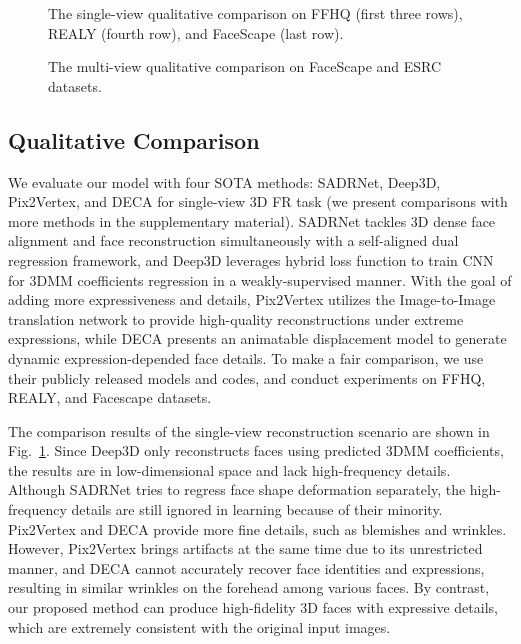 \documentclass[10pt,twocolumn,letterpaper]{article}
\begin{document}
\begin{figure}[t]
  \centering
     \vspace{-10pt}
  \caption{The single-view qualitative comparison on FFHQ (first three rows), REALY (fourth row), and FaceScape (last row).}
  \label{fig: cmp}
  \vspace{-10pt}
\end{figure} 


\begin{figure}[t]
  \centering
     \vspace{-5pt}
  \caption{The multi-view qualitative comparison on FaceScape and ESRC datasets.}
  \label{fig: multiview_cmp}
  \vspace{-15pt}
\end{figure} 



\subsection{Qualitative Comparison}
We evaluate our model with four SOTA methods: SADRNet\cite{ruan2021sadrnet}, Deep3D\cite{deng2019accurate}, Pix2Vertex\cite{sela2017unrestricted}, and DECA\cite{feng2021learning} for single-view 3D FR task (we present comparisons with more methods\cite{chen2019photo,zhang2021learning} in the supplementary material). SADRNet tackles 3D dense face alignment and face reconstruction simultaneously with a self-aligned dual regression framework, and Deep3D leverages hybrid loss function to train CNN for 3DMM coefficients regression in a weakly-supervised manner. With the goal of adding more expressiveness and details, Pix2Vertex utilizes the Image-to-Image translation network to provide high-quality reconstructions under extreme expressions, while DECA presents an animatable displacement model to generate dynamic expression-depended face details. To make a fair comparison, we use their publicly released models and codes, and conduct experiments on FFHQ, REALY, and Facescape datasets.

The comparison results of the single-view reconstruction scenario are shown in Fig.~\ref{fig: cmp}. Since Deep3D only reconstructs faces using predicted 3DMM coefficients, the results are in low-dimensional space and lack high-frequency details. Although SADRNet tries to regress face shape deformation separately, the high-frequency details are still ignored in learning because of their minority. Pix2Vertex and DECA provide more fine details, such as blemishes and wrinkles. However, Pix2Vertex brings artifacts at the same time due to its unrestricted manner, and DECA cannot accurately recover face identities and expressions, resulting in similar wrinkles on the forehead among various faces. By contrast, our proposed method can produce high-fidelity 3D faces with expressive details, which are extremely consistent with the original input images. 
\end{document}
